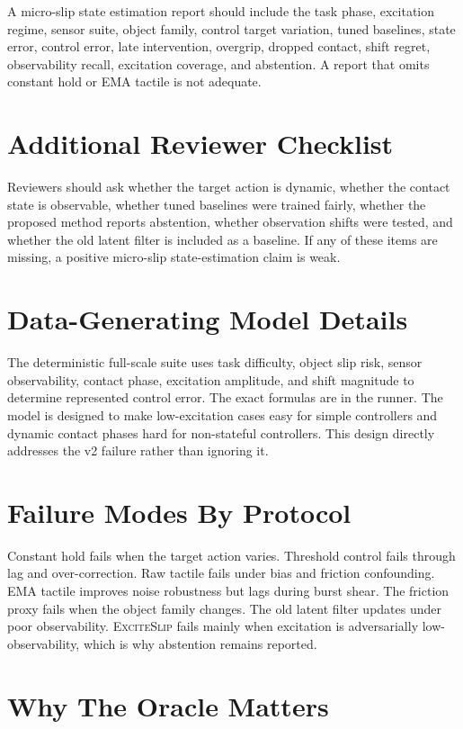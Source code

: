 \documentclass{article}
\newcommand{\method}{\textsc{ExciteSlip}\xspace}
\begin{document}
A micro-slip state estimation report should include the task phase, excitation regime, sensor suite, object family, control target variation, tuned baselines, state error, control error, late intervention, overgrip, dropped contact, shift regret, observability recall, excitation coverage, and abstention. A report that omits constant hold or EMA tactile is not adequate.

\section{Additional Reviewer Checklist}

Reviewers should ask whether the target action is dynamic, whether the contact state is observable, whether tuned baselines were trained fairly, whether the proposed method reports abstention, whether observation shifts were tested, and whether the old latent filter is included as a baseline. If any of these items are missing, a positive micro-slip state-estimation claim is weak.

\section{Data-Generating Model Details}

The deterministic full-scale suite uses task difficulty, object slip risk, sensor observability, contact phase, excitation amplitude, and shift magnitude to determine represented control error. The exact formulas are in the runner. The model is designed to make low-excitation cases easy for simple controllers and dynamic contact phases hard for non-stateful controllers. This design directly addresses the v2 failure rather than ignoring it.

\section{Failure Modes By Protocol}

Constant hold fails when the target action varies. Threshold control fails through lag and over-correction. Raw tactile fails under bias and friction confounding. EMA tactile improves noise robustness but lags during burst shear. The friction proxy fails when the object family changes. The old latent filter updates under poor observability. \method fails mainly when excitation is adversarially low-observability, which is why abstention remains reported.

\section{Why The Oracle Matters}
\end{document}
